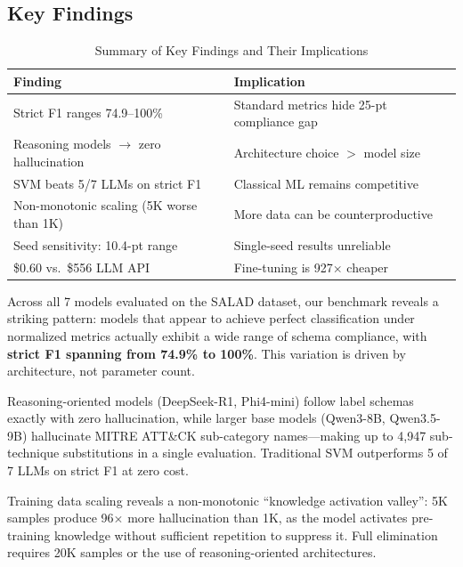 \documentclass[journal]{IEEEtran}
\begin{document}
\subsection{Key Findings}

\begin{table}[!ht]
\centering
\caption{Summary of Key Findings and Their Implications}
\label{tab:findings}
\begin{tabular}{p{3.5cm}p{4cm}}
\toprule
\textbf{Finding} & \textbf{Implication} \\
\midrule
Strict F1 ranges 74.9--100\% & Standard metrics hide 25-pt compliance gap \\
Reasoning models $\to$ zero hallucination & Architecture choice $>$ model size \\
SVM beats 5/7 LLMs on strict F1 & Classical ML remains competitive \\
Non-monotonic scaling (5K worse than 1K) & More data can be counterproductive \\
Seed sensitivity: 10.4-pt range & Single-seed results unreliable \\
\$0.60 vs.\ \$556 LLM API & Fine-tuning is 927$\times$ cheaper \\
\bottomrule
\end{tabular}
\end{table}

Across all 7 models evaluated on the SALAD dataset, our benchmark reveals a striking pattern: models that appear to achieve perfect classification under normalized metrics actually exhibit a wide range of schema compliance, with \textbf{strict F1 spanning from 74.9\% to 100\%}. This variation is driven by architecture, not parameter count.

Reasoning-oriented models (DeepSeek-R1, Phi4-mini) follow label schemas exactly with zero hallucination, while larger base models (Qwen3-8B, Qwen3.5-9B) hallucinate MITRE ATT\&CK sub-category names---making up to 4,947 sub-technique substitutions in a single evaluation. Traditional SVM outperforms 5 of 7 LLMs on strict F1 at zero cost.

Training data scaling reveals a non-monotonic ``knowledge activation valley'': 5K samples produce 96$\times$ more hallucination than 1K, as the model activates pre-training knowledge without sufficient repetition to suppress it. Full elimination requires 20K samples or the use of reasoning-oriented architectures.
\end{document}
